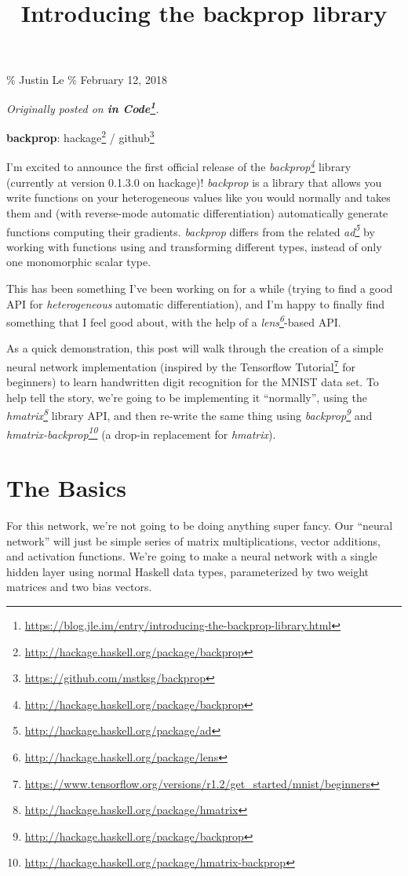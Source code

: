 \documentclass[]{article}
\title{Introducing the backprop library}
\renewcommand{\href}[2]{#2\footnote{\url{#1}}}
\begin{document}
\maketitle

\% Justin Le \% February 12, 2018

\emph{Originally posted on
\textbf{\href{https://blog.jle.im/entry/introducing-the-backprop-library.html}{in
Code}}.}

\textbf{backprop}: \href{http://hackage.haskell.org/package/backprop}{hackage} /
\href{https://github.com/mstksg/backprop}{github}

I'm excited to announce the first official release of the
\emph{\href{http://hackage.haskell.org/package/backprop}{backprop}} library
(currently at version 0.1.3.0 on hackage)! \emph{backprop} is a library that
allows you write functions on your heterogeneous values like you would normally
and takes them and (with reverse-mode automatic differentiation) automatically
generate functions computing their gradients. \emph{backprop} differs from the
related \emph{\href{http://hackage.haskell.org/package/ad}{ad}} by working with
functions using and transforming different types, instead of only one
monomorphic scalar type.

This has been something I've been working on for a while (trying to find a good
API for \emph{heterogeneous} automatic differentiation), and I'm happy to
finally find something that I feel good about, with the help of a
\emph{\href{http://hackage.haskell.org/package/lens}{lens}}-based API.

As a quick demonstration, this post will walk through the creation of a simple
neural network implementation (inspired by the
\href{https://www.tensorflow.org/versions/r1.2/get_started/mnist/beginners}{Tensorflow
Tutorial} for beginners) to learn handwritten digit recognition for the MNIST
data set. To help tell the story, we're going to be implementing it
``normally'', using the
\emph{\href{http://hackage.haskell.org/package/hmatrix}{hmatrix}} library API,
and then re-write the same thing using
\emph{\href{http://hackage.haskell.org/package/backprop}{backprop}} and
\emph{\href{http://hackage.haskell.org/package/hmatrix-backprop}{hmatrix-backprop}}
(a drop-in replacement for \emph{hmatrix}).

\section{The Basics}\label{the-basics}

For this network, we're not going to be doing anything super fancy. Our ``neural
network'' will just be simple series of matrix multiplications, vector
additions, and activation functions. We're going to make a neural network with a
single hidden layer using normal Haskell data types, parameterized by two weight
matrices and two bias vectors.
\end{document}
